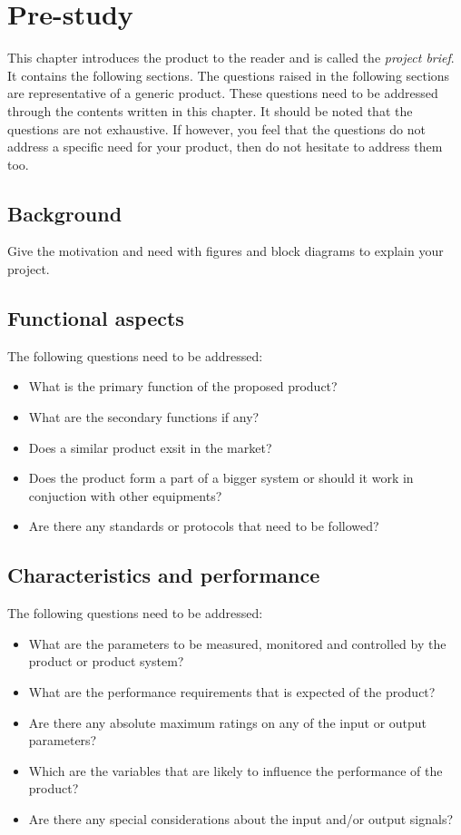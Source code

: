 
\chapter{Pre-study}

This chapter introduces the product to the reader and is called the
\emph{project brief}. It contains the following sections. The questions
raised in the following sections are representative of a generic product.
These questions need to be addressed through the contents written
in this chapter. It should be noted that the questions are not exhaustive.
If however, you feel that the questions do not address a specific
need for your product, then do not hesitate to address them too.

\section{Background}

Give the motivation and need with figures and block diagrams to explain
your project.

\section{Functional aspects}

The following questions need to be addressed:
\begin{itemize}
\item What is the primary function of the proposed product?
\item What are the secondary functions if any?
\item Does a similar product exsit in the market?
\item Does the product form a part of a bigger system or should it work
in conjuction with other equipments?
\item Are there any standards or protocols that need to be followed?
\end{itemize}

\section{Characteristics and performance}

The following questions need to be addressed:
\begin{itemize}
\item What are the parameters to be measured, monitored and controlled by
the product or product system?
\item What are the performance requirements that is expected of the product?
\item Are there any absolute maximum ratings on any of the input or output
parameters?
\item Which are the variables that are likely to influence the performance
of the product?
\item Are there any special considerations about the input and/or output
signals?
\end{itemize}

